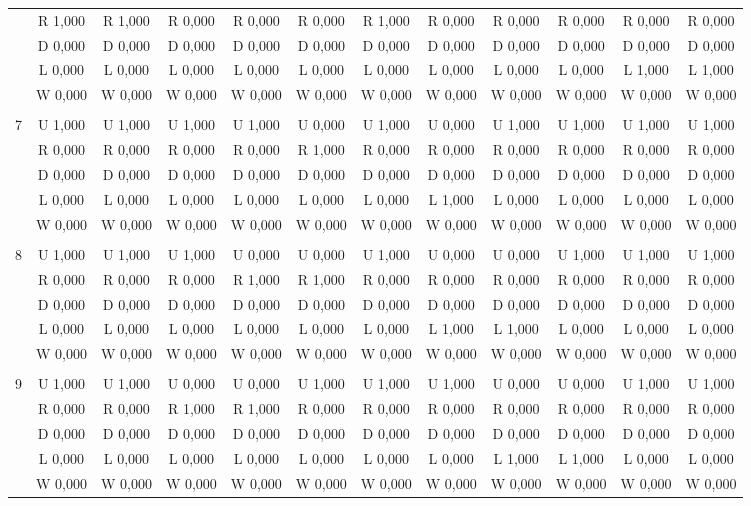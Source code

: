 \begin{table}[htbp]
\begin{tiny}
\begin{tabular}{c|c|c|c|c|c|c|c|c|c|c|c|}
&R 1,000&R 1,000&R 0,000&R 0,000&R 0,000&R 1,000&R 0,000&R 0,000&R 0,000&R 0,000&R 0,000\\
&D 0,000&D 0,000&D 0,000&D 0,000&D 0,000&D 0,000&D 0,000&D 0,000&D 0,000&D 0,000&D 0,000\\
&L 0,000&L 0,000&L 0,000&L 0,000&L 0,000&L 0,000&L 0,000&L 0,000&L 0,000&L 1,000&L 1,000\\
&W 0,000&W 0,000&W 0,000&W 0,000&W 0,000&W 0,000&W 0,000&W 0,000&W 0,000&W 0,000&W 0,000\\
\hline \\
7&U 1,000&U 1,000&U 1,000&U 1,000&U 0,000&U 1,000&U 0,000&U 1,000&U 1,000&U 1,000&U 1,000\\
&R 0,000&R 0,000&R 0,000&R 0,000&R 1,000&R 0,000&R 0,000&R 0,000&R 0,000&R 0,000&R 0,000\\
&D 0,000&D 0,000&D 0,000&D 0,000&D 0,000&D 0,000&D 0,000&D 0,000&D 0,000&D 0,000&D 0,000\\
&L 0,000&L 0,000&L 0,000&L 0,000&L 0,000&L 0,000&L 1,000&L 0,000&L 0,000&L 0,000&L 0,000\\
&W 0,000&W 0,000&W 0,000&W 0,000&W 0,000&W 0,000&W 0,000&W 0,000&W 0,000&W 0,000&W 0,000\\
\hline \\
8&U 1,000&U 1,000&U 1,000&U 0,000&U 0,000&U 1,000&U 0,000&U 0,000&U 1,000&U 1,000&U 1,000\\
&R 0,000&R 0,000&R 0,000&R 1,000&R 1,000&R 0,000&R 0,000&R 0,000&R 0,000&R 0,000&R 0,000\\
&D 0,000&D 0,000&D 0,000&D 0,000&D 0,000&D 0,000&D 0,000&D 0,000&D 0,000&D 0,000&D 0,000\\
&L 0,000&L 0,000&L 0,000&L 0,000&L 0,000&L 0,000&L 1,000&L 1,000&L 0,000&L 0,000&L 0,000\\
&W 0,000&W 0,000&W 0,000&W 0,000&W 0,000&W 0,000&W 0,000&W 0,000&W 0,000&W 0,000&W 0,000\\
\hline \\
9&U 1,000&U 1,000&U 0,000&U 0,000&U 1,000&U 1,000&U 1,000&U 0,000&U 0,000&U 1,000&U 1,000\\
&R 0,000&R 0,000&R 1,000&R 1,000&R 0,000&R 0,000&R 0,000&R 0,000&R 0,000&R 0,000&R 0,000\\
&D 0,000&D 0,000&D 0,000&D 0,000&D 0,000&D 0,000&D 0,000&D 0,000&D 0,000&D 0,000&D 0,000\\
&L 0,000&L 0,000&L 0,000&L 0,000&L 0,000&L 0,000&L 0,000&L 1,000&L 1,000&L 0,000&L 0,000\\
&W 0,000&W 0,000&W 0,000&W 0,000&W 0,000&W 0,000&W 0,000&W 0,000&W 0,000&W 0,000&W 0,000\\

\end{tabular}
\end{tiny}
\end{table}
